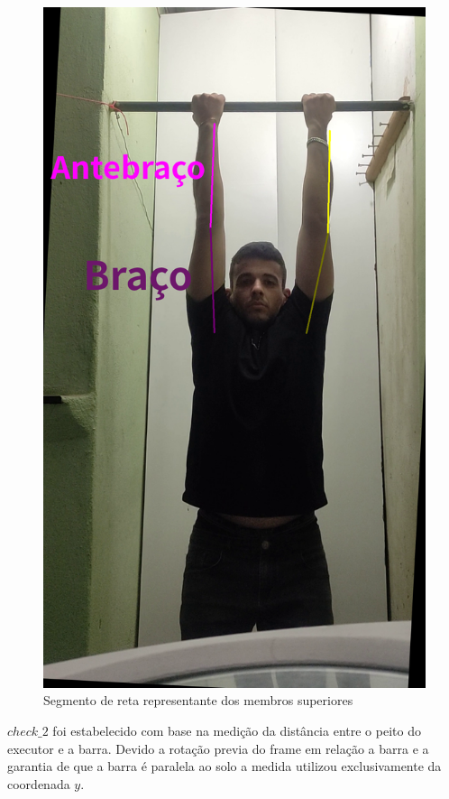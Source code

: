 \begin{figure}[!htb]
	\centering
	\includegraphics[scale=0.2]{figuras/braco_esticado/82_braco_antebraco.png}
	\caption{Segmento de reta representante dos membros superiores}
	\label{fig:braco_antebraco}
\end{figure}

$check\_2$ foi estabelecido com base na medição da distância entre o peito do executor e a barra. Devido a rotação previa do frame em relação a barra e a garantia de que a barra é paralela ao solo a medida utilizou exclusivamente da coordenada $y$.

